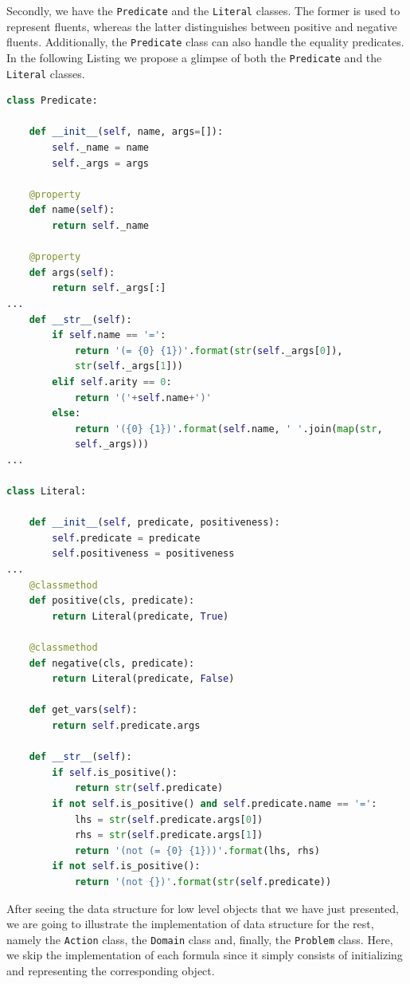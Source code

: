 Secondly, we have the \texttt{Predicate} and the \texttt{Literal} classes. The former is used to represent \PDDL fluents, whereas the latter distinguishes between positive and negative fluents. Additionally, the \texttt{Predicate} class can also handle the equality predicates. In the following Listing we propose a glimpse of both the \texttt{Predicate} and the \texttt{Literal} classes.
\begin{lstlisting}[language=Python, style=Python, escapechar = £,  label={code:fond-pred-lit}, caption={The \texttt{Predicate} and the \texttt{Literal} classes.}]
class Predicate:

    def __init__(self, name, args=[]):
        self._name = name
        self._args = args

    @property
    def name(self):
        return self._name

    @property
    def args(self):
        return self._args[:]
...
    def __str__(self):
        if self.name == '=':
            return '(= {0} {1})'.format(str(self._args[0]), 
            str(self._args[1]))
        elif self.arity == 0:
            return '('+self.name+')'
        else:
            return '({0} {1})'.format(self.name, ' '.join(map(str, 
            self._args)))
...

class Literal:

    def __init__(self, predicate, positiveness):
        self.predicate = predicate
        self.positiveness = positiveness
...
    @classmethod
    def positive(cls, predicate):
        return Literal(predicate, True)

    @classmethod
    def negative(cls, predicate):
        return Literal(predicate, False)

    def get_vars(self):
        return self.predicate.args

    def __str__(self):
        if self.is_positive():
            return str(self.predicate)
        if not self.is_positive() and self.predicate.name == '=':
            lhs = str(self.predicate.args[0])
            rhs = str(self.predicate.args[1])
            return '(not (= {0} {1}))'.format(lhs, rhs)
        if not self.is_positive():
            return '(not {})'.format(str(self.predicate))
\end{lstlisting}

After seeing the data structure for low level objects that we have just presented, we are going to illustrate the implementation of data structure for the rest, namely the \texttt{Action} class, the \texttt{Domain} class and, finally, the \texttt{Problem} class. Here, we skip the implementation of each formula since it simply consists of initializing and representing the corresponding object.

